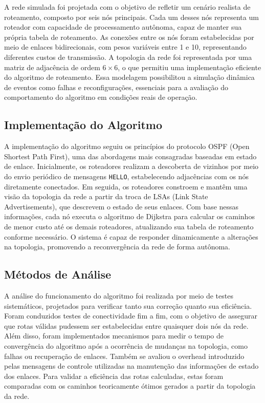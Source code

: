 \documentclass[12pt]{article}
\begin{document}
A rede simulada foi projetada com o objetivo de refletir um cenário realista de roteamento, composto por seis nós principais. Cada um desses nós representa um roteador com capacidade de processamento autônoma, capaz de manter sua própria tabela de roteamento. As conexões entre os nós foram estabelecidas por meio de enlaces bidirecionais, com pesos variáveis entre 1 e 10, representando diferentes custos de transmissão. A topologia da rede foi representada por uma matriz de adjacência de ordem $6 \times 6$, o que permitiu uma implementação eficiente do algoritmo de roteamento. Essa modelagem possibilitou a simulação dinâmica de eventos como falhas e reconfigurações, essenciais para a avaliação do comportamento do algoritmo em condições reais de operação.

\subsection{Implementação do Algoritmo}

A implementação do algoritmo seguiu os princípios do protocolo OSPF (Open Shortest Path First), uma das abordagens mais consagradas baseadas em estado de enlace. Inicialmente, os roteadores realizam a descoberta de vizinhos por meio do envio periódico de mensagens \texttt{HELLO}, estabelecendo adjacências com os nós diretamente conectados. Em seguida, os roteadores constroem e mantêm uma visão da topologia da rede a partir da troca de LSAs (Link State Advertisements), que descrevem o estado de seus enlaces. Com base nessas informações, cada nó executa o algoritmo de Dijkstra para calcular os caminhos de menor custo até os demais roteadores, atualizando sua tabela de roteamento conforme necessário. O sistema é capaz de responder dinamicamente a alterações na topologia, promovendo a reconvergência da rede de forma autônoma.

\subsection{Métodos de Análise}

A análise do funcionamento do algoritmo foi realizada por meio de testes sistemáticos, projetados para verificar tanto sua correção quanto sua eficiência. Foram conduzidos testes de conectividade fim a fim, com o objetivo de assegurar que rotas válidas pudessem ser estabelecidas entre quaisquer dois nós da rede. Além disso, foram implementados mecanismos para medir o tempo de convergência do algoritmo após a ocorrência de mudanças na topologia, como falhas ou recuperação de enlaces. Também se avaliou o overhead introduzido pelas mensagens de controle utilizadas na manutenção das informações de estado dos enlaces. Para validar a eficiência das rotas calculadas, estas foram comparadas com os caminhos teoricamente ótimos gerados a partir da topologia da rede.
\end{document}
